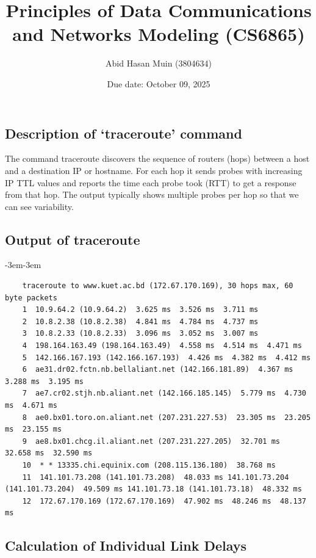 \documentclass[12pt]{article}
\title{
	\textbf{Principles of Data Communications and Networks Modeling (CS6865)} \\[2mm]
	\text{Modeling data networks: selecting simulation parameters}
}
\author{Abid Hasan Muin (3804634)}
\date{Due date: October 09, 2025}
\begin{document}
	
	\maketitle
	
	\section{}
	
	\subsection{Description of `traceroute' command}
	
	The command	traceroute discovers the sequence of routers (hops) between a host and a destination IP or hostname. For each hop it sends probes with increasing IP TTL values and reports the time each probe took (RTT) to get a response from that hop. The output typically shows multiple probes per hop so that we can see variability.
	
	\subsection{Output of traceroute}
	
	\begin{adjustwidth}{-3em}{-3em}
	\begin{lstlisting}
	traceroute to www.kuet.ac.bd (172.67.170.169), 30 hops max, 60 byte packets
	1  10.9.64.2 (10.9.64.2)  3.625 ms  3.526 ms  3.711 ms
	2  10.8.2.38 (10.8.2.38)  4.841 ms  4.784 ms  4.737 ms
	3  10.8.2.33 (10.8.2.33)  3.096 ms  3.052 ms  3.007 ms
	4  198.164.163.49 (198.164.163.49)  4.558 ms  4.514 ms  4.471 ms
	5  142.166.167.193 (142.166.167.193)  4.426 ms  4.382 ms  4.412 ms
	6  ae31.dr02.fctn.nb.bellaliant.net (142.166.181.89)  4.367 ms  3.288 ms  3.195 ms
	7  ae7.cr02.stjh.nb.aliant.net (142.166.185.145)  5.779 ms  4.730 ms  4.671 ms
	8  ae0.bx01.toro.on.aliant.net (207.231.227.53)  23.305 ms  23.205 ms  23.155 ms
	9  ae8.bx01.chcg.il.aliant.net (207.231.227.205)  32.701 ms  32.658 ms  32.590 ms
	10  * * 13335.chi.equinix.com (208.115.136.180)  38.768 ms
	11  141.101.73.208 (141.101.73.208)  48.033 ms 141.101.73.204 (141.101.73.204)  49.509 ms 141.101.73.18 (141.101.73.18)  48.332 ms
	12  172.67.170.169 (172.67.170.169)  47.902 ms  48.246 ms  48.137 ms
	\end{lstlisting}
	\end{adjustwidth}
	
	\subsection{Calculation of Individual Link Delays}
	
\end{document}

